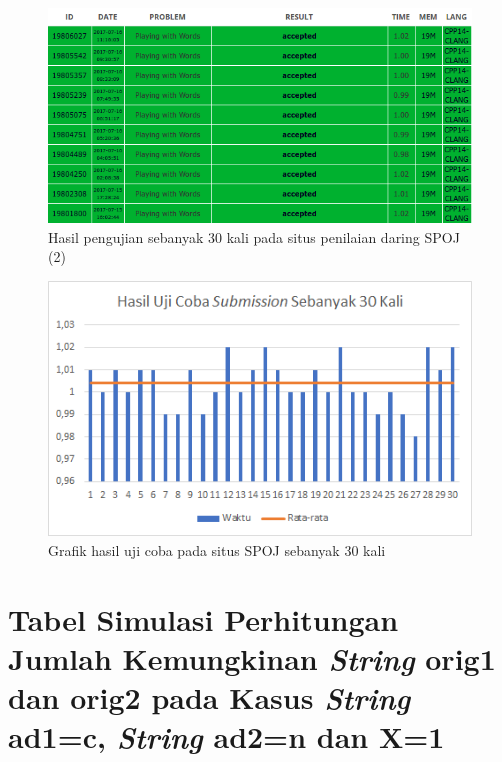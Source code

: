 \begin{appendices}
  \begin{figure}[H]
  	\centerline{ \includegraphics[scale=0.6]{assets/images/ujisubmission2.png}}
  	\caption{Hasil pengujian sebanyak 30 kali pada situs penilaian daring SPOJ (2)}
  	\label{figure:submission2}
  \end{figure}
  
  \begin{figure}[H]
  	\centerline{ \includegraphics[scale=0.7]{assets/images/submission-chart.png}}
  	\caption{Grafik hasil uji coba pada situs SPOJ sebanyak 30 kali}
  	\label{figure:chart}
  \end{figure}
  
  \chapter{Tabel Simulasi Perhitungan Jumlah Kemungkinan \textit{String} orig1 dan orig2 pada Kasus \textit{String} ad1=c, \textit{String} ad2=n dan X=1}
  \setcounter{table}{0}
  \renewcommand{\thetable}{C.\arabic{table}}
  \renewcommand{\thefigure}{C.\arabic{figure}}
  
  

\end{appendices}
